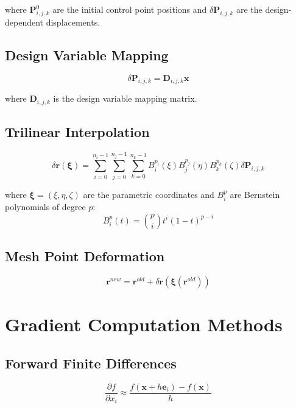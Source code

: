 \documentclass{article}
\begin{document}
where $\mathbf{P}_{i,j,k}^0$ are the initial control point positions and $\delta \mathbf{P}_{i,j,k}$ are the design-dependent displacements.

\subsection{Design Variable Mapping}
\begin{equation}
\delta \mathbf{P}_{i,j,k} = \mathbf{D}_{i,j,k} \mathbf{x}
\end{equation}

where $\mathbf{D}_{i,j,k}$ is the design variable mapping matrix.

\subsection{Trilinear Interpolation}
\begin{equation}
\delta \mathbf{r}(\boldsymbol{\xi}) = \sum_{i=0}^{n_i-1} \sum_{j=0}^{n_j-1} \sum_{k=0}^{n_k-1} B_i^{p_i}(\xi) B_j^{p_j}(\eta) B_k^{p_k}(\zeta) \delta \mathbf{P}_{i,j,k}
\end{equation}

where $\boldsymbol{\xi} = (\xi, \eta, \zeta)$ are the parametric coordinates and $B_i^p$ are Bernstein polynomials of degree $p$:
\begin{equation}
B_i^p(t) = \binom{p}{i} t^i (1-t)^{p-i}
\end{equation}

\subsection{Mesh Point Deformation}
\begin{equation}
\mathbf{r}^{new} = \mathbf{r}^{old} + \delta \mathbf{r}(\boldsymbol{\xi}(\mathbf{r}^{old}))
\end{equation}

\section{Gradient Computation Methods}

\subsection{Forward Finite Differences}
\begin{equation}
\frac{\partial f}{\partial x_i} \approx \frac{f(\mathbf{x} + h \mathbf{e}_i) - f(\mathbf{x})}{h}
\end{equation}
\end{document}
